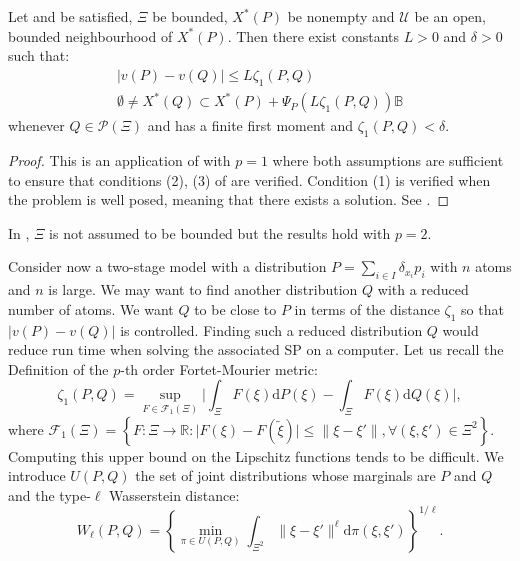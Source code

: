\documentclass{amsart}
\newcommand{\RR}{\mathbb{R}}
\begin{document}
\begin{corollary}
    Let  and  be satisfied, $\Xi$ be bounded, $X^*\left(P\right)$ be nonempty and $\mathcal{U}$ be an open, bounded neighbourhood of $X^*\left(P\right).$ Then there exist constants $L>0$ and $\delta >0$ such that:
    \begin{align*}
        \lvert v\left(P\right)-v\left(Q\right)\rvert \leq L\zeta_1\left(P,Q\right) \\
        \emptyset \ne X^*\left(Q\right)\subset X^*\left(P\right)+\Psi_P\left(L\zeta_1\left(P,Q\right)\right)\mathbb{B}
    \end{align*}
    whenever $Q\in\mathcal{P}\left(\Xi\right)$ and has a finite first moment and $\zeta_1\left(P,Q\right)<\delta$.
\end{corollary}
\begin{proof}
    This is an application of  with $p=1$ where both assumptions are sufficient to ensure that conditions (2), (3) of  are verified. Condition (1) is verified when the problem is well posed, meaning that there exists a solution. See \cite[Proposition 22]{romisch_stability_2003}.
\end{proof}
\begin{remark}
    In \cite{romisch_stability_2003}, $\Xi$ is not assumed to be bounded but the results hold with $p=2$.
\end{remark}
Consider now a two-stage model with a distribution $P=\sum_{i\in I}\delta_{x_i}p_i$ with $n$ atoms and $n$ is large. We may want to find another distribution $Q$ with a reduced number of atoms. We want $Q$ to be close to $P$ in terms of the distance $\zeta_1$ so that $\lvert v\left(P\right)-v\left(Q\right)\rvert$ is controlled. Finding such a reduced distribution $Q$ would reduce run time when solving the associated SP on a computer. Let us recall the Definition of the $p$-th order Fortet-Mourier metric:
$$
\zeta_1\left(P,Q\right)=\sup_{F\in\mathcal{F}_1\left(\Xi\right)}\lvert \int_\Xi F\left(\xi\right)\text{d}P\left(\xi\right)-\int_\Xi F\left(\xi\right)\text{d}Q\left(\xi\right)\rvert,
$$
where $\mathcal{F}_1\left(\Xi\right)=\left\{F:\Xi\to \RR: \lvert F\left(\xi\right)-F\left(\tilde{\xi}\right)\rvert \leq \lVert\xi-\xi'\rVert, \forall \left(\xi,\xi'\right)\in \Xi^2 \right\}$. Computing this upper bound on the Lipschitz functions tends to be difficult. We introduce $U\left(P,Q\right)$ the set of joint distributions whose marginals are $P$ and $Q$ and the type-$\ell$ Wasserstein distance: $$
W_\ell\left(P,Q\right) = \left\{\min_{\pi\in U\left(P,Q\right)}\int_{\Xi^2}\lVert \xi-\xi'\rVert^\ell \text{d}\pi\left(\xi,\xi'\right)\right\}^{1/\ell}.$$
\end{document}
